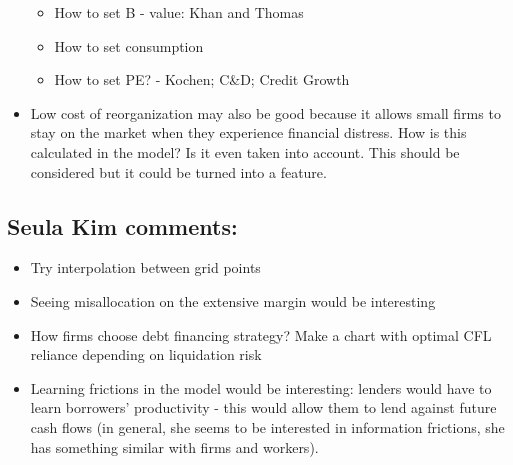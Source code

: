 \documentclass[12pt]{article}
\begin{document}
\begin{itemize}
    \begin{itemize}\setlength\itemsep{0em} 
        \item How to set B - value: Khan and Thomas 
        \item How to set consumption
        \item How to set PE? - Kochen; C\&D; Credit Growth
    \end{itemize}
    \item Low cost of reorganization may also be good because it allows small firms to stay on the market when they experience financial distress. How is this calculated in the model? Is it even taken into account. This should be considered but it could be turned into a feature. 
\end{itemize} \normalsize

\subsection*{Seula Kim comments:} 
\begin{itemize} \setlength\itemsep{0em} \small
    \item Try interpolation between grid points 
    \item Seeing misallocation on the extensive margin would be interesting
    \item How firms choose debt financing strategy? Make a chart with optimal CFL reliance depending on liquidation risk
    \item Learning frictions in the model would be interesting: lenders would have to learn borrowers' productivity - this would allow them to lend against future cash flows (in general, she seems to be interested in information frictions, she has something similar with firms and workers). 
\end{itemize} \normalsize 
\end{document}
